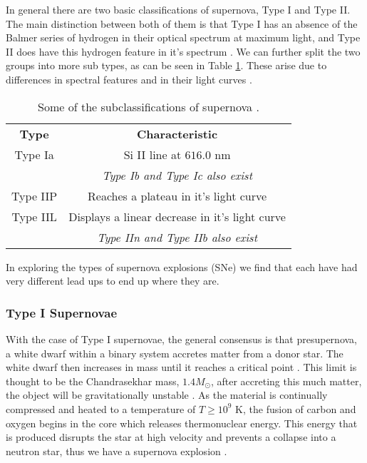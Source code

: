 \documentclass[twocolumn]{revtex4}
\begin{document}
In general there are two basic classifications of supernova, Type I and Type II. The main distinction between both of them is that Type I has an absence of the Balmer series of hydrogen in their optical spectrum at maximum light, and Type II does have this hydrogen feature in it's spectrum \cite{mod_ast, longair}. We can further split the two groups into more sub types, as can be seen in Table \ref{sn_classes}. These arise due to differences in spectral features and in their light curves \cite{longair}.

\begin{table}[h!]
\centering
\begin{tabular}{c@{\hskip 20pt}c} 
 \hline
 \textbf{Type} & \textbf{Characteristic} \\ 
 Type Ia		& Si II line at $616.0$ nm \\
 			& \em Type Ib and Type Ic also exist \em \\
 Type IIP 		& Reaches a plateau in it's light curve \\
 Type IIL		& Displays a linear decrease in it's light curve \\
 			& \em Type IIn and Type IIb also exist \em \\
 \hline
\end{tabular}
\caption{Some of the subclassifications of supernova \cite{longair}.}
\label{sn_classes}
\end{table}

In exploring the types of supernova explosions (SNe) we find that each have had very different lead ups to end up where they are. 

\vspace{-3ex}
\subsubsection{Type I Supernovae}
\vspace{-2ex}
With the case of Type I supernovae, the general consensus is that presupernova, a white dwarf within a binary system accretes matter from a donor star. The white dwarf then increases in mass until it reaches a critical point \cite{posn, longair}. This limit is thought to be the Chandrasekhar mass, $1.4 M_{\odot}$, after accreting this much matter, the object will be gravitationally unstable \cite{longair}. As the material is continually compressed and heated to a temperature of $T \geq 10^9$ K, the fusion of carbon and oxygen begins in the core which releases thermonuclear energy. This energy that is produced disrupts the star at high velocity and prevents a collapse into a neutron star, thus we have a supernova explosion \cite{posn}.
\end{document}
